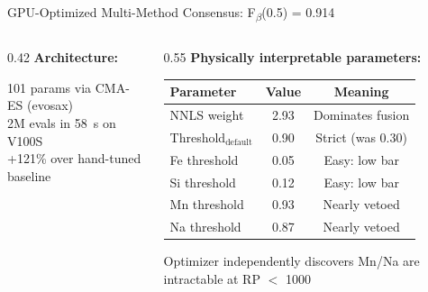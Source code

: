 \documentclass[aspectratio=169,10pt]{beamer}
\begin{document}
\begin{frame}{GPU-Optimized Multi-Method Consensus: F\textsubscript{$\beta$}(0.5) = 0.914}
	\begin{columns}[T]
		\begin{column}{0.42\textwidth}
			\textbf{Architecture:}\\[0.2em]

			\vspace{0.2em}
			{\small 101 params via CMA-ES (evosax)\\
			2M evals in \alert{58~s} on V100S\\
			\alert{+121\%} over hand-tuned baseline}
		\end{column}
		\begin{column}{0.55\textwidth}
			{\small\textbf{Physically interpretable parameters:}}\\[0.2em]
			{\footnotesize
			\begin{tabular}{lcc}
				\toprule
				\textbf{Parameter} & \textbf{Value} & \textbf{Meaning} \\
				\midrule
				NNLS weight & \alert{2.93} & Dominates fusion \\
				Threshold$_{\text{default}}$ & 0.90 & Strict (was 0.30) \\
				\midrule
				Fe threshold & 0.05 & Easy: low bar \\
				Si threshold & 0.12 & Easy: low bar \\
				Mn threshold & 0.93 & Nearly vetoed \\
				Na threshold & 0.87 & Nearly vetoed \\
				\bottomrule
			\end{tabular}}

			\vspace{0.2em}
			{\footnotesize Optimizer independently discovers
			Mn/Na are intractable at RP $<$ 1000}
		\end{column}
	\end{columns}
\end{frame}
\end{document}
